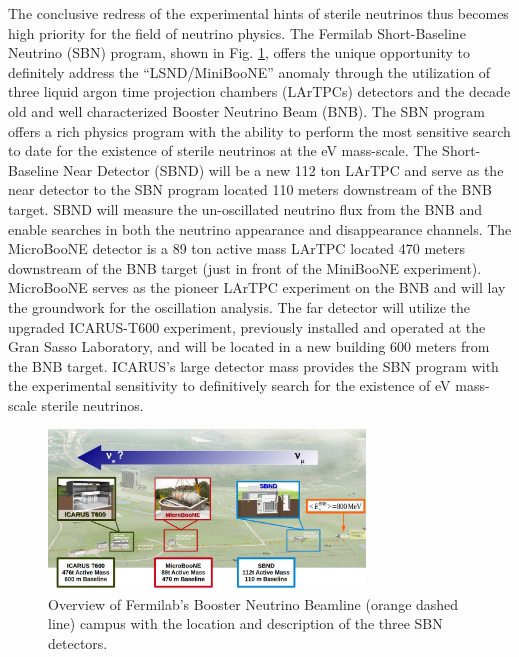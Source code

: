 

The conclusive redress of the experimental hints of sterile neutrinos thus becomes high priority for the field of neutrino physics. The Fermilab Short-Baseline Neutrino (SBN) program, shown in Fig. \ref{fig:SBNMap}, offers the unique opportunity to definitely address the ``LSND/MiniBooNE'' anomaly through the utilization of three liquid argon time projection chambers (LArTPCs) detectors and the decade old and well characterized Booster Neutrino Beam (BNB). The SBN program offers a rich physics program with the ability to perform the most sensitive search to date for the existence of sterile neutrinos at the eV mass-scale. The Short-Baseline Near Detector (SBND) will be a new 112 ton LArTPC and serve as the near detector to the SBN program located 110 meters downstream of the BNB target. SBND will measure the un-oscillated neutrino flux from the BNB and enable searches in both the neutrino appearance and disappearance channels. The MicroBooNE detector is a 89 ton active mass LArTPC located 470 meters downstream of the BNB target (just in front of the MiniBooNE experiment). MicroBooNE serves as the pioneer LArTPC experiment on the BNB and will lay the groundwork for the oscillation analysis. The far detector will utilize the upgraded ICARUS-T600 experiment, previously installed and operated at the Gran Sasso Laboratory, and will be located in a new building 600 meters from the BNB target. ICARUS's large detector mass provides the SBN program with the experimental sensitivity to definitively search for the existence of eV mass-scale sterile neutrinos.

\begin{figure}[htb]
\centering
\includegraphics[width=0.75\textwidth]{images/SBNLayout2.png}
\caption[]{Overview of Fermilab's Booster Neutrino Beamline (orange dashed line) campus with the location and description of the three SBN detectors.}
\label{fig:SBNMap}
\end{figure}


